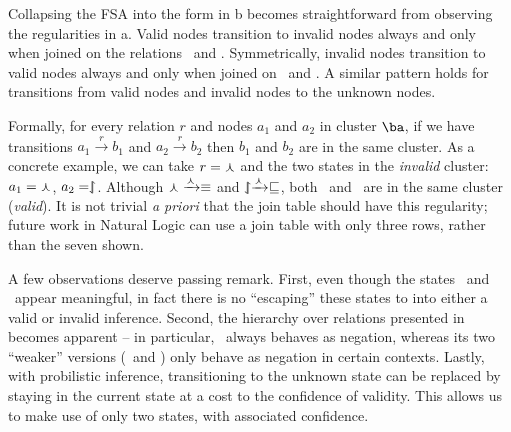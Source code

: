 Collapsing the FSA into the form in b becomes straightforward
  from observing the regularities in a.
Valid nodes transition to invalid nodes always and only when joined
  on the relations \negate\ and \alternate.
Symmetrically, invalid nodes transition to valid nodes always and only
  when joined on \negate\ and \cover.
A similar pattern holds for transitions from valid nodes and invalid
  nodes to the unknown nodes.

Formally, for every relation $r$ and nodes $a_1$ and $a_2$ in
  cluster $\ba$,
  if we have transitions 
  $a_1 \xrightarrow{r} b_1$ and $a_2 \xrightarrow{r} b_2$
  then $b_1$ and $b_2$ are in the same cluster.
As a concrete example, we can take $r = \curlywedge$ and
  the two states in the \textit{invalid} cluster:
  $a_1 = \curlywedge$, $a_2 = \downharpoonleft\hspace{-1.25mm}\upharpoonright$.
Although $\curlywedge \xrightarrow{\curlywedge} \equiv$ and
  $\downharpoonleft\hspace{-1.25mm}\upharpoonright \xrightarrow{\curlywedge} \sqsubseteq$, both
  \equivalent\ and \forward\ are in the same cluster (\textit{valid}).
It is not trivial \textit{a priori} that the join table should have
  this regularity;
  future work in Natural Logic can use a join table with only
  three rows, rather than the seven shown.

A few observations deserve passing remark.
First, even though the
  states \reverse\ and \cover\ appear meaningful, in fact there is no
  ``escaping'' these states to into either a valid or invalid
  inference.
Second, the hierarchy over relations presented in
   becomes apparent -- in particular,
  \negate\ always behaves as negation, whereas its two ``weaker''
  versions (\alternate\ and \cover) only behave as negation in certain
  contexts.
Lastly, with probilistic inference,
  transitioning to the unknown state can be replaced by staying in the
  current state at a cost to the confidence of validity.
This allows us to make use of only two states, with associated
  confidence.


